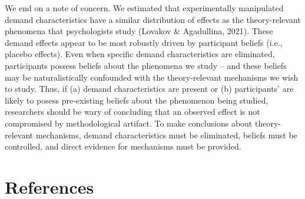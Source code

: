 \documentclass[
  man,floatsintext]{apa6}
\begin{document}
We end on a note of concern. We estimated that experimentally manipulated demand characteristics have a similar distribution of effects as the theory-relevant phenomena that psychologists study (Lovakov \& Agadullina, 2021). These demand effects appear to be most robustly driven by participant beliefs (i.e., placebo effects). Even when specific demand characteristics are eliminated, participants possess beliefs about the phenomena we study -- and these beliefs may be naturalistically confounded with the theory-relevant mechanisms we wish to study. Thus, if (a) demand characteristics are present or (b) participants' are likely to posess pre-existing beliefs about the phenomenon being studied, researchers should be wary of concluding that an observed effect is not compromised by methodological artifact. To make conclusions about theory-relevant mechanisms, demand characteristics must be eliminated, beliefs must be controlled, and direct evidence for mechanisms must be provided.

\hypertarget{references}{%
\section{References}\label{references}}
\end{document}
